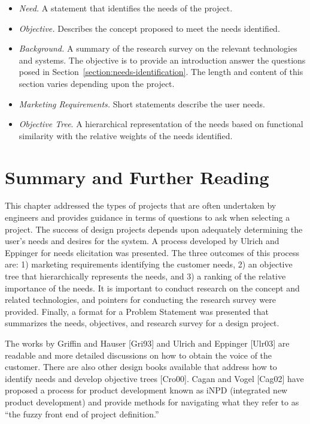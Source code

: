 \begin{itemize}
\item
  \emph{Need.} A statement that identifies the needs of the project.
\item
  \emph{Objective.} Describes the concept proposed to meet the needs
  identified.
\item
  \emph{Background.} A summary of the research survey on the relevant
  technologies and systems. The objective is to provide an introduction
  answer the questions posed in Section~\ref{section:needs-identification}. 
  The length and content of
  this section varies depending upon the project.
\item
  \emph{Marketing Requirements.} Short statements describe the user
  needs.
\item
  \emph{Objective Tree}. A hierarchical representation of the needs
  based on functional similarity with the relative weights of the needs
  identified.
\end{itemize}

\section{Summary and Further Reading}
\label{section:summary-and-further-reading}

This chapter addressed the types of projects that are often undertaken
by engineers and provides guidance in terms of questions to ask when
selecting a project. The success of design projects depends upon
adequately determining the user's needs and desires for the system. A
process developed by Ulrich and Eppinger for needs elicitation was
presented. The three outcomes of this process are: 1) marketing
requirements identifying the customer needs, 2) an objective tree that
hierarchically represents the needs, and 3) a ranking of the relative
importance of the needs. It is important to conduct research on the
concept and related technologies, and pointers for conducting the
research survey were provided. Finally, a format for a Problem Statement
was presented that summarizes the needs, objectives, and research survey
for a design project.

The works by Griffin and Hauser {[}Gri93{]} and Ulrich and Eppinger
{[}Ulr03{]} are readable and more detailed discussions on how to obtain
the voice of the customer. There are also other design books available
that address how to identify needs and develop objective trees
{[}Cro00{]}. Cagan and Vogel {[}Cag02{]} have proposed a process for
product development known as iNPD (integrated new product development)
and provide methods for navigating what they refer to as ``the fuzzy
front end of project definition.''
